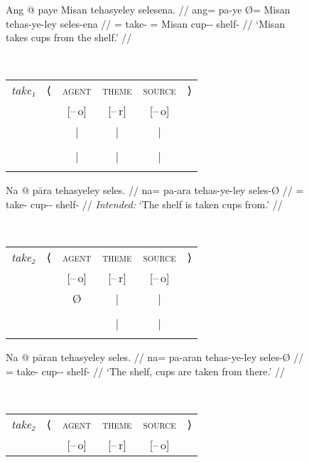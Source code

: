 \begin{figure}
\pex\label{ex:derargpass}
\a\label{ex:derargpass_1}%
\begin{minipage}[t]{.4\remaining}
\begingl
	\gla Ang @ paye {} Misan tehasyeley selesena. //
	\glb ang= pa-ye Ø= Misan tehas-ye-ley seles-ena //
	\glc \AgtT{}= take-\TsgF{} \Top{}= Misan cup-\Pl{}-\PargI{} shelf-\Gen{} //
	\glft `Misan takes cups from the shelf.' //
\endgl
\end{minipage}
~
\begin{tabular}[t]{>{\itshape}l l c c c r}
take₁
	& ⟨
	& \textsc{agent}
	& \textsc{theme}
	& \textsc{source}
	& ⟩
	\\
%
	& %
	& [–\,o]
	& [–\,r]
	& [–\,o]
	& %
	\\

%
	& %
	& |
	& |
	& |
	& %
	\\

%
	& %
	& \Subj
	& \Obj
	& \Oblq{src}
	& %
	\\

%
	& %
	& |
	& |
	& |
	& %
	\\

%
	& %
	& \fw{Misan}
	& \fw{cups}
	& \fw{shelf}
	& %
	\\
\end{tabular}

\a\label{ex:derargpass_2}\ljudge*%
\begin{minipage}[t]{.4\remaining}%
\begingl
	\gla Na @ pāra tehasyeley seles. //
	\glb na= pa-ara tehas-ye-ley seles-Ø //
	\glc \GenT{}= take-\TsgI{} cup-\Pl{}-\PargI{} shelf-\Top{} //
	\glft \textit{Intended:} `The shelf is taken cups from.' //
\endgl
\end{minipage}
~
\begin{tabular}[t]{>{\itshape}l l c c c r}
take₂
	& ⟨
	& \textsc{agent}
	& \textsc{theme}
	& \textsc{source}
	& ⟩
	\\
%
	& %
	& [–\,o]
	& [–\,r]
	& [–\,o]
	& %
	\\

%
	& %
	& Ø
	& |
	& |
	& %
	\\

%
	& %
	& %
	& \Obj
	& \Subj
	& %
	\\

%
	& %
	& %
	& |
	& |
	& %
	\\

%
	& %
	& %
	& \fw{cups}
	& \fw{shelf}
	& %
	\\
\end{tabular}

\a\label{ex:derargpass_3}%
\begin{minipage}[t]{.4\remaining}
\begingl
	\gla Na @ pāran tehasyeley seles. //
	\glb na= pa-aran tehas-ye-ley seles-Ø //
	\glc \GenT{}= take-\TplI{} cup-\Pl{}-\PargI{} shelf-\Top{} //
	\glft `The shelf, cups are taken from there.' //
\endgl
\end{minipage}
~
\begin{tabular}[t]{>{\itshape}l l c c c r}
take₂
	& ⟨
	& \textsc{agent}
	& \textsc{theme}
	& \textsc{source}
	& ⟩
	\\
%
	& %
	& [–\,o]
	& [–\,r]
	& [–\,o]
	& %
	\\


\end{tabular}
\end{figure}

